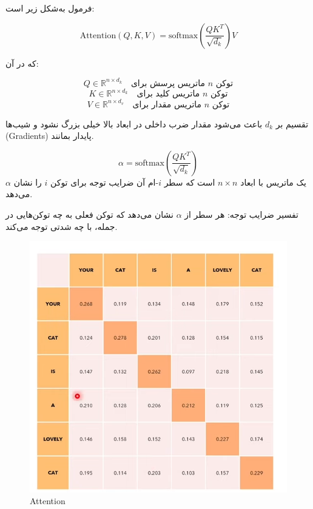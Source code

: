 فرمول به‌شکل زیر است:

\begin{equation}
	\text{Attention}(Q, K, V) = \text{softmax}\left( \frac{QK^T}{\sqrt{d_k}} \right) V
	\label{eq:attention}
\end{equation}

که در آن:

\[
Q \in \mathbb{R}^{n \times d_k} \quad \text{ماتریس پرسش برای } n \text{ توکن}
\]
\[
K \in \mathbb{R}^{n \times d_k} \quad \text{ماتریس کلید برای } n \text{ توکن}
\]
\[
V \in \mathbb{R}^{n \times d_v} \quad \text{ماتریس مقدار برای } n \text{ توکن}
\]

تقسیم بر \( d_k \) باعث می‌شود مقدار ضرب داخلی در ابعاد بالا خیلی بزرگ نشود و شیب‌ها (Gradients) پایدار بمانند.

\begin{equation}
	\alpha = \text{softmax}\left( \frac{QK^T}{\sqrt{d_k}} \right)
	\label{eq:alpha}
\end{equation}
\(\alpha\) یک ماتریس با ابعاد \( n \times n \) است که سطر \( i \)-ام آن ضرایب توجه برای توکن \( i \) را نشان می‌دهد.

تفسیر ضرایب توجه: هر سطر از \( \alpha \) نشان می‌دهد که توکن فعلی به چه توکن‌هایی در جمله، با چه شدتی توجه می‌کند.



\begin{figure}[h]
	\centering
	\begin{minipage}[b]{0.7\textwidth}
		\centering
		\includegraphics[width=\textwidth]{transformer_images/attention.png}
		\caption{Attention}
		\label{fig:attention}
	\end{minipage}
	\hfill
	
\end{figure}





